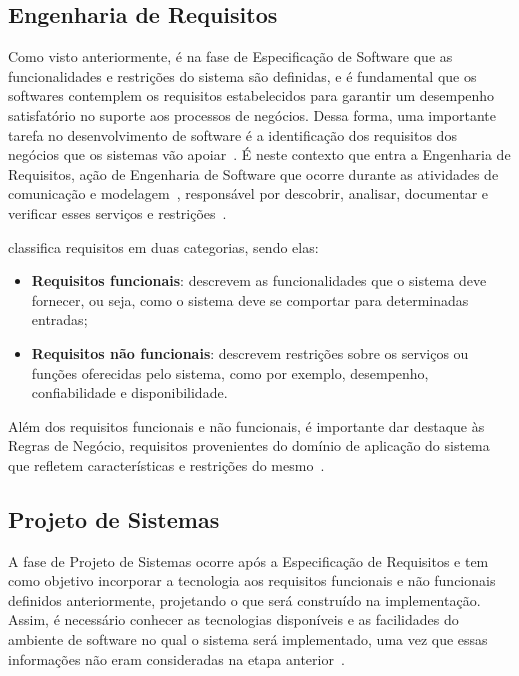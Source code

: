 \subsection{Engenharia de Requisitos}
\label{subsec-fundteo-engsoft-engreq}

Como visto anteriormente, é na fase de Especificação de Software que as funcionalidades 
e restrições do sistema são definidas, e é fundamental que os softwares contemplem os
requisitos estabelecidos para garantir um desempenho satisfatório no suporte aos processos 
de negócios. Dessa forma, uma importante tarefa no desenvolvimento de software é a
identificação dos requisitos dos negócios que os sistemas vão apoiar~\cite{falbo:2017}.
É neste contexto que entra a Engenharia de Requisitos, ação de Engenharia de 
Software que ocorre durante as atividades de comunicação e modelagem~\cite{pressman:2011},
responsável por descobrir, analisar, documentar e verificar esses serviços e restrições~\cite{sommerville:2011}. 

 classifica requisitos em duas categorias, sendo elas:

\begin{itemize}
    \item \textbf{Requisitos funcionais}: descrevem as funcionalidades que o sistema deve 
        fornecer, ou seja, como o sistema deve se comportar para determinadas entradas;
    \item \textbf{Requisitos não funcionais}: descrevem restrições sobre os serviços ou
        funções oferecidas pelo sistema, como por exemplo, desempenho, confiabilidade e 
        disponibilidade. 
\end{itemize}

Além dos requisitos funcionais e não funcionais, é importante dar destaque às Regras de
Negócio, requisitos provenientes do domínio de aplicação do sistema que refletem características
e restrições do mesmo~\cite{sommerville:2011,falbo:2014}.



\subsection{Projeto de Sistemas}
\label{subsec-fundteo-engsoft-projsis}

A fase de Projeto de Sistemas ocorre após a Especificação de Requisitos e tem como objetivo
incorporar a tecnologia aos requisitos funcionais e não funcionais definidos anteriormente,
projetando o que será construído na implementação. 
Assim, é necessário conhecer as tecnologias disponíveis e as facilidades do ambiente de software no qual o
sistema será implementado, uma vez que essas informações não eram consideradas na etapa
anterior~\cite{falbo:2014,pressman:2011}. 

